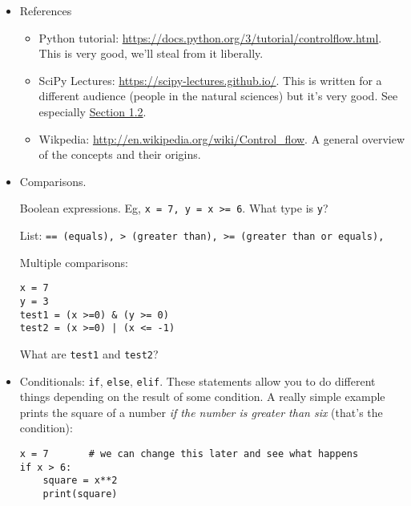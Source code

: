 \documentclass[11pt]{article}
\begin{document}
%
\begin{itemize}
\item References
\begin{itemize}
\item Python tutorial:  \url{https://docs.python.org/3/tutorial/controlflow.html}.
This is very good, we'll steal from it liberally.

\item SciPy Lectures:  \url{https://scipy-lectures.github.io/}.
This is written for a different audience (people in the natural sciences)
but it's very good.
See especially \href{https://scipy-lectures.github.io/intro/language/python_language.html}{Section 1.2}.

\item Wikpedia:  \url{http://en.wikipedia.org/wiki/Control_flow}.
A general overview of the concepts and their origins.
\end{itemize}

\begin{comment}

Separate sections for conditionals and loops

Overview.  Have picture for conditional statement:  if (condition) is True, do one thing, if false
do another

Conditions (Boolean expressions).
5 == 6
5==5
'Dave' > 'Glenn'

Compound conditions. ??

Loops
i = 0.1
Use a loop over n to determine how many periods it takes to double your money.
That is, find the first n for which (1+i)**n > 2.

Check Comm 64, Coursera, etc for examples

\end{comment}

\item Comparisons.

Boolean expressions. Eg, {\tt x = 7, y = x >= 6}.
What type is {\tt y}?

List:  {\tt == (equals), > (greater than), >= (greater than or equals), }

Multiple comparisons:
\begin{verbatim}
x = 7
y = 3
test1 = (x >=0) & (y >= 0)
test2 = (x >=0) | (x <= -1)
\end{verbatim}
What are {\tt test1} and {\tt test2}?

\item Conditionals: {\tt if}, {\tt else}, {\tt elif}.
These statements allow you to do different things depending
on the result of some condition.  A really simple example
prints the square of a number {\it if the number is greater than six\/}
(that's the condition):
%
\begin{verbatim}
x = 7       # we can change this later and see what happens
if x > 6:
    square = x**2
    print(square)


\end{verbatim}
\end{itemize}
\end{document}
